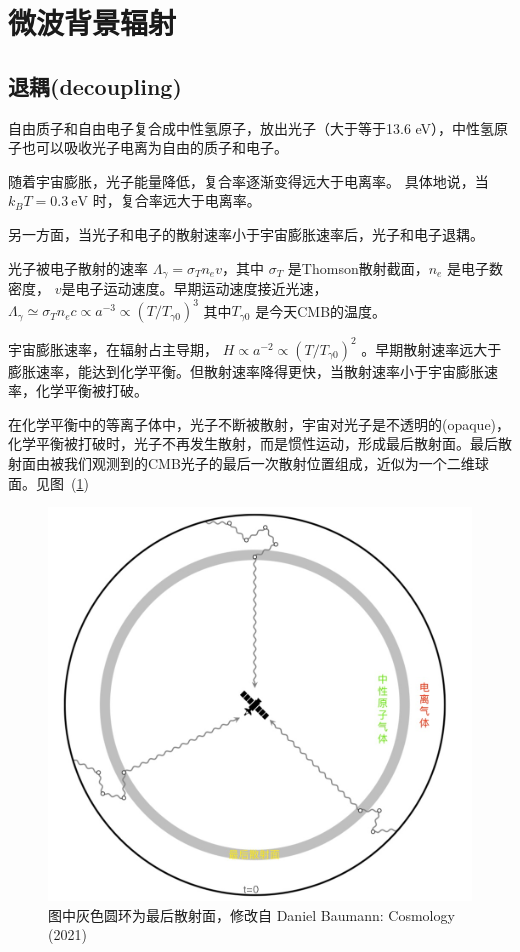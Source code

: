 \documentclass[]{ctexart}
\newcommand{\reffig}[1]{图~(\ref{#1})}
\begin{document}
\section{微波背景辐射}

\subsection{退耦(decoupling)}

自由质子和自由电子复合成中性氢原子，放出光子（大于等于13.6 eV），中性氢原子也可以吸收光子电离为自由的质子和电子。

随着宇宙膨胀，光子能量降低，复合率逐渐变得远大于电离率。
具体地说，当 $k_B T =0.3 \mathrm{~eV}$ 时，复合率远大于电离率。

另一方面，当光子和电子的散射速率小于宇宙膨胀速率后，光子和电子退耦。

光子被电子散射的速率 $\Lambda_\gamma = \sigma_T n_e v$，其中 $\sigma_T$ 是Thomson散射截面，$n_e$ 是电子数密度， $v$是电子运动速度。早期运动速度接近光速，$\Lambda_\gamma \simeq \sigma_T n_e c \propto a^{-3} \propto \left(T/T_{\gamma 0}\right)^3 $ 其中$T_{\gamma 0}$ 是今天CMB的温度。

宇宙膨胀速率，在辐射占主导期， $H\propto a^{-2} \propto \left(T/T_{\gamma 0}\right)^2$ 。早期散射速率远大于膨胀速率，能达到化学平衡。但散射速率降得更快，当散射速率小于宇宙膨胀速率，化学平衡被打破。

在化学平衡中的等离子体中，光子不断被散射，宇宙对光子是不透明的(opaque)，化学平衡被打破时，光子不再发生散射，而是惯性运动，形成最后散射面。最后散射面由被我们观测到的CMB光子的最后一次散射位置组成，近似为一个二维球面。见\reffig{fig.LastScat}

\begin{figure}[!hbtp]
	\centering
	\includegraphics[width=1.0\linewidth]{lastScatter2022.jpg}
	\caption{图中灰色圆环为最后散射面，修改自 Daniel Baumann: Cosmology (2021)} \label{fig.LastScat}
\end{figure}
\end{document}
